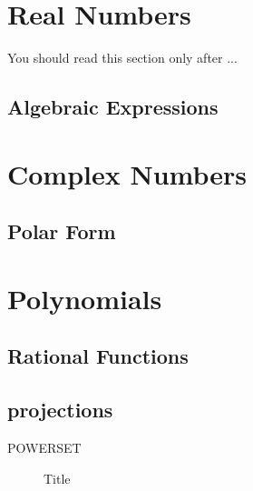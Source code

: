 \section{Real Numbers}

You should read this section only after ...

\subsection{Algebraic Expressions}

\section{Complex Numbers}

\subsection{Polar Form}

\section{Polynomials}

\subsection{Rational Functions}

\subsection{projections}
POWERSET

\begin{figure}[t]
\begin{center}
\end{center}
\caption{Title}
\label{figlabel}
\end{figure}

